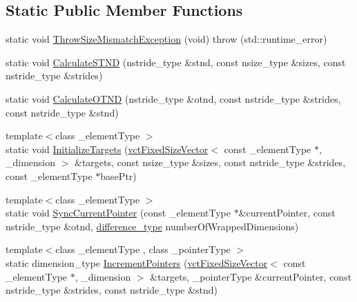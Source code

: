 \subsection*{Static Public Member Functions}
\begin{DoxyCompactItemize}
\item 
static void \hyperlink{classvct_dynamic_n_array_loop_engines_a785abf22d2322be74fdb0b8b834c44cd}{Throw\-Size\-Mismatch\-Exception} (void)  throw (std\-::runtime\-\_\-error)
\item 
static void \hyperlink{classvct_dynamic_n_array_loop_engines_ae88b8397b6859672d54c8caf720d1fab}{Calculate\-S\-T\-N\-D} (nstride\-\_\-type \&stnd, const nsize\-\_\-type \&sizes, const nstride\-\_\-type \&strides)
\item 
static void \hyperlink{classvct_dynamic_n_array_loop_engines_a6d983fd04968226618130831bcf39876}{Calculate\-O\-T\-N\-D} (nstride\-\_\-type \&otnd, const nstride\-\_\-type \&strides, const nstride\-\_\-type \&stnd)
\item 
{\footnotesize template$<$class \-\_\-element\-Type $>$ }\\static void \hyperlink{classvct_dynamic_n_array_loop_engines_a20664a56f6678bcad4f546aa0655f513}{Initialize\-Targets} (\hyperlink{classvct_fixed_size_vector}{vct\-Fixed\-Size\-Vector}$<$ const \-\_\-element\-Type $\ast$, \-\_\-dimension $>$ \&targets, const nsize\-\_\-type \&sizes, const nstride\-\_\-type \&strides, const \-\_\-element\-Type $\ast$base\-Ptr)
\item 
{\footnotesize template$<$class \-\_\-element\-Type $>$ }\\static void \hyperlink{classvct_dynamic_n_array_loop_engines_a0b6398ab903f658134e9f606bda183cf}{Sync\-Current\-Pointer} (const \-\_\-element\-Type $\ast$\&current\-Pointer, const nstride\-\_\-type \&otnd, \hyperlink{classvct_dynamic_n_array_loop_engines_ae8d37731d603321cd52e0a6a6d13a017}{difference\-\_\-type} number\-Of\-Wrapped\-Dimensions)
\item 
{\footnotesize template$<$class \-\_\-element\-Type , class \-\_\-pointer\-Type $>$ }\\static dimension\-\_\-type \hyperlink{classvct_dynamic_n_array_loop_engines_a885fbc2237c49073b2c2c7d8de3a25ba}{Increment\-Pointers} (\hyperlink{classvct_fixed_size_vector}{vct\-Fixed\-Size\-Vector}$<$ const \-\_\-element\-Type $\ast$, \-\_\-dimension $>$ \&targets, \-\_\-pointer\-Type \&current\-Pointer, const nstride\-\_\-type \&strides, const nstride\-\_\-type \&stnd)
\end{DoxyCompactItemize}


